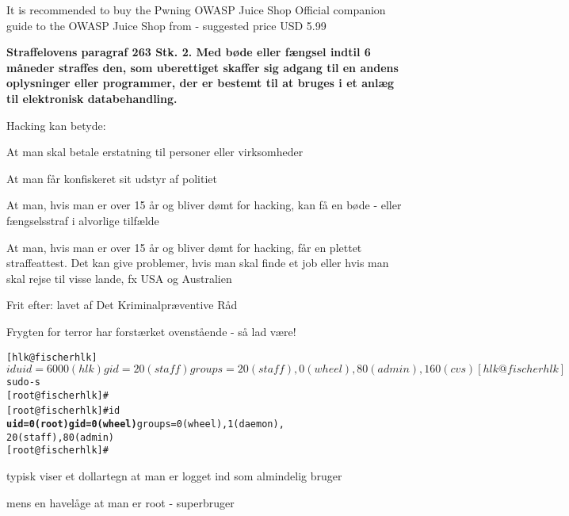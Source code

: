 \documentclass[Screen16to9,17pt]{foils}
\begin{document}
It is recommended to buy the Pwning OWASP Juice Shop Official companion guide to the OWASP Juice Shop from  - suggested price USD 5.99



\vskip 1cm
{\bfseries Straffelovens paragraf 263 Stk. 2. Med bøde eller fængsel
  indtil 6 måneder
straffes den, som uberettiget skaffer sig adgang til en andens
oplysninger eller programmer, der er bestemt til at bruges i et anlæg
til elektronisk databehandling.}

Hacking kan betyde:
\begin{list2}
\item At man skal betale erstatning til personer eller virksomheder
\item At man får konfiskeret sit udstyr af politiet
\item At man, hvis man er over 15 år og bliver dømt for hacking, kan
  få en bøde - eller fængselsstraf i alvorlige tilfælde
\item At man, hvis man er over 15 år og bliver dømt for hacking, får
en plettet straffeattest. Det kan give problemer, hvis man skal finde
et job eller hvis man skal rejse til visse lande, fx USA og
Australien
\item Frit efter:  lavet af Det
  Kriminalpræventive Råd
\item Frygten for terror har forstærket ovenstående - så lad være!
\end{list2}








\begin{alltt}
\small
[hlk@fischer hlk]$ id
uid=6000(hlk) gid=20(staff) groups=20(staff),
0(wheel), 80(admin), 160(cvs)
[hlk@fischer hlk]$ sudo -s
[root@fischer hlk]#
[root@fischer hlk]# id {\bf
uid=0(root) gid=0(wheel)} groups=0(wheel), 1(daemon),
20(staff), 80(admin)
[root@fischer hlk]#
\end{alltt}

\begin{list1}
\item typisk viser et dollartegn at man er logget ind som almindelig bruger
\item mens en havelåge at man er root - superbruger
\end{list1}
\end{document}
